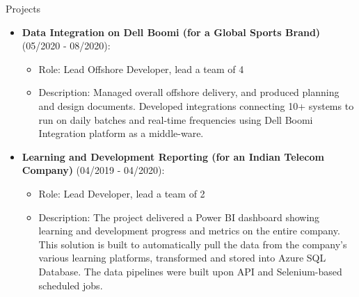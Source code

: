 \documentclass{resume} %
\begin{document}
\begin{rSection}{Projects}
        \begin{itemize}
            \item \textbf{Data Integration on Dell Boomi (for a Global Sports Brand)} (05/2020 - 08/2020):
            \begin{itemize}
                \item Role: Lead Offshore Developer, lead a team of 4
                \item Description: Managed overall offshore delivery, and produced planning and design documents. Developed integrations connecting 10+ systems to run on daily batches and real-time frequencies using Dell Boomi Integration platform as a middle-ware.
            \end{itemize}
        \end{itemize}
        
        \begin{itemize}
            \item \textbf{Learning and Development Reporting (for an Indian Telecom Company)} (04/2019 - 04/2020):
            \begin{itemize}
                \item Role: Lead Developer, lead a team of 2
                \item Description: The project delivered a Power BI dashboard showing learning and development progress and metrics on the entire company. This solution is built to automatically pull the data from the company's various learning platforms, transformed and stored into Azure SQL Database. The data pipelines were built upon API and Selenium-based scheduled jobs.
            \end{itemize}
        \end{itemize}
        
    \end{rSection}
    
    
\end{document}
